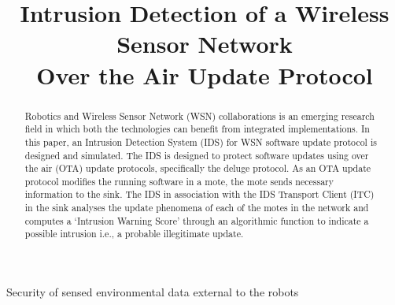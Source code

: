 \documentclass[conference,final]{IEEEtran}
\begin{document}
\title{Intrusion Detection of a Wireless Sensor Network\\Over the Air Update Protocol}
\author{
}



\maketitle


\begin{abstract}
Robotics and  Wireless Sensor Network (WSN) collaborations is an emerging research field in which both the technologies can benefit from integrated implementations.
In this paper, an Intrusion Detection System (IDS) for WSN  software update protocol is designed and simulated. 
The IDS is designed to protect software updates using over the air (OTA) update protocols, specifically the deluge protocol.
As an OTA update protocol modifies the running software in a mote, the mote sends necessary information to the sink. 
The IDS in association with the IDS Transport Client (ITC) in the sink analyses the update phenomena of each of the
motes in the network and computes a `Intrusion Warning Score' through an algorithmic function to indicate a possible intrusion i.e., a probable illegitimate update.
\end{abstract}

\begin{keyword}
\end{keyword}

%
\IEEEpeerreviewmaketitle %
Security of sensed environmental data external to the robots
\end{document}
